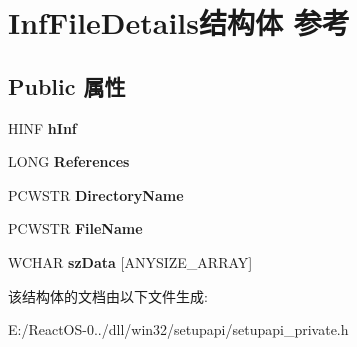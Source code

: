 \hypertarget{struct_inf_file_details}{}\section{Inf\+File\+Details结构体 参考}
\label{struct_inf_file_details}
\subsection*{Public 属性}
\begin{DoxyCompactItemize}
\item 
\mbox{\label{struct_inf_file_details_afd025df9941579da4f26b8490f9a7c3b}} 
H\+I\+NF {\bfseries h\+Inf}
\item 
\mbox{\label{struct_inf_file_details_aa9904fa4049ecc9887b27f1228e196e0}} 
L\+O\+NG {\bfseries References}
\item 
\mbox{\label{struct_inf_file_details_a1ca5f760b81b7ced858cc2fdcd95b790}} 
P\+C\+W\+S\+TR {\bfseries Directory\+Name}
\item 
\mbox{\label{struct_inf_file_details_a905404ef1d375f3443bc75952fe308c7}} 
P\+C\+W\+S\+TR {\bfseries File\+Name}
\item 
\mbox{\label{struct_inf_file_details_af71c2173ec2b95b8aa645c70bc2d984a}} 
W\+C\+H\+AR {\bfseries sz\+Data} \mbox{[}A\+N\+Y\+S\+I\+Z\+E\+\_\+\+A\+R\+R\+AY\mbox{]}
\end{DoxyCompactItemize}


该结构体的文档由以下文件生成\+:\begin{DoxyCompactItemize}
\item 
E\+:/\+React\+O\+S-\/0../dll/win32/setupapi/setupapi\+\_\+private.\+h\end{DoxyCompactItemize}
